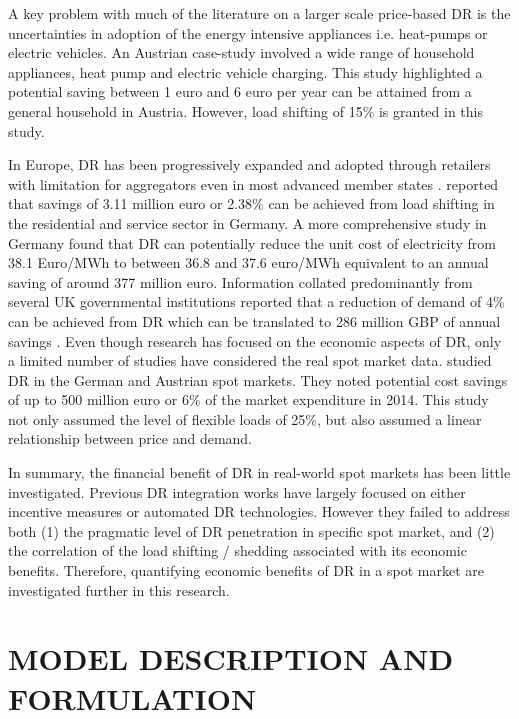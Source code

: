 \documentclass{pasa}%
\begin{document}
A key problem with much of the literature on a larger scale price-based DR is the uncertainties in adoption of the energy intensive appliances i.e. heat-pumps or electric vehicles. An Austrian case-study \citep{prggler2012}  involved a wide range of household appliances, heat pump and electric vehicle charging. This study highlighted a potential saving between 1 euro and 6 euro per year can be attained from a  general household in Austria. However, load shifting of 15\% is granted in this study.

In Europe, DR has been progressively expanded and adopted through retailers with limitation for aggregators even in most advanced member states \cite{bertoldi2016}.  \cite{feuerriegel2016}  reported that  savings of 3.11 million euro or 2.38\% can be achieved from load shifting  in the residential and  service sector in Germany. A more comprehensive study in Germany \citep{hcgils2016} found that DR can potentially reduce the unit cost of electricity from 38.1 Euro/MWh to between 36.8  and 37.6 euro/MWh  equivalent to an annual saving of around 377 million euro. Information collated predominantly from several UK governmental institutions reported that a reduction of demand of 4\% can be achieved from DR which can be translated to 286 million GBP of annual savings \cite{bradley2013}. Even though research has focused on the economic aspects of DR, only a limited number of studies have considered the real spot market data. \cite{markle2018} studied DR in the German and Austrian spot markets. They noted potential cost savings of up to 500 million euro or 6\% of the market expenditure in 2014. This study not only assumed the level of flexible loads of 25\%, but also assumed a linear relationship between price and demand.

In summary, the financial benefit of DR in real-world spot markets has been little investigated. Previous DR integration works have largely focused on either incentive measures or automated DR technologies. However they failed to address both (1) the pragmatic level of DR penetration in specific spot market, and (2) the correlation of the load shifting / shedding associated with its economic benefits. Therefore, quantifying economic benefits of DR in a spot market are investigated further in this research.



\section{MODEL DESCRIPTION AND FORMULATION}
\end{document}
